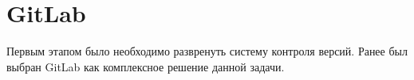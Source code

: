 \section{GitLab}
\label{sec:gitlab}

Первым этапом было необходимо развренуть систему контроля версий. Ранее был выбран GitLab как комплексное решение данной задачи.
